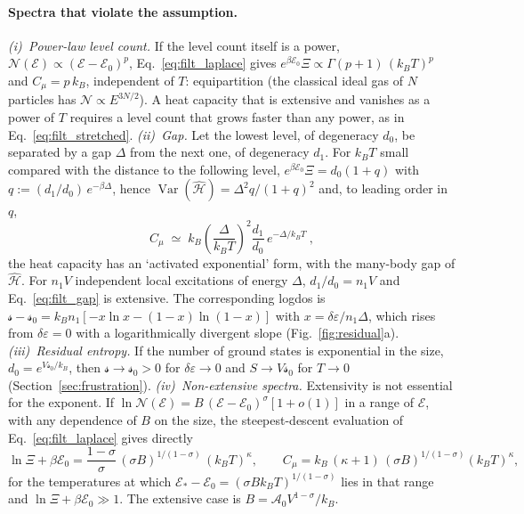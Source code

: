 \documentclass[10pt,a4paper]{article}
\theoremstyle{plain}
\newcommand{\Var}{\operatorname{Var}}
\newcommand{\cN}{\mathcal{N}}   %
\newcommand{\cA}{{\mathcal{A}_0}}   %
\newcommand{\lndos}{{logdos}}  %
\newcommand{\enrg}{\mathcal{E}}  %
\newcommand{\lds}{\mathscr{s}}  %
\begin{document}
\paragraph{Spectra that violate the assumption.}
\emph{(i)~Power-law level count.} If the level count itself is a power,
$\cN(\enrg)\propto(\enrg-\enrg_0)^{p}$, Eq.~\eqref{eq:filt_laplace} gives
$e^{\beta\enrg_0}\Xi\propto\Gamma(p+1)\,(k_BT)^{p}$ and $C_\mu=p\,k_B$,
independent of $T$: equipartition (the classical ideal gas of $N$ particles
has $\cN\propto E^{3N/2}$). A heat capacity that is extensive and vanishes
as a power of $T$ requires a level count that grows faster than any power,
as in Eq.~\eqref{eq:filt_stretched}.
\emph{(ii)~Gap.} Let the lowest level, of degeneracy $d_0$, be separated by
a gap $\Delta$ from the next one, of degeneracy $d_1$. For $k_BT$ small
compared with the distance to the following level,
$e^{\beta\enrg_0}\Xi=d_0(1+q)$ with $q:=(d_1/d_0)\,e^{-\beta\Delta}$, hence
$\Var(\hat{\mathcal H})=\Delta^{2}q/(1+q)^{2}$ and, to leading order in $q$,
\begin{equation}\label{eq:filt_gap}
  C_\mu \;\simeq\; k_B\left(\frac{\Delta}{k_BT}\right)^{2}\frac{d_1}{d_0}\,e^{-\Delta/k_BT} ~,
\end{equation}
the heat capacity has an `activated exponential' form, with the many-body gap of
$ \hat{\mathcal{H}} $. For $n_1V$ independent local excitations of energy
$\Delta$, $d_1/d_0=n_1V$ and Eq.~\eqref{eq:filt_gap} is extensive. The
corresponding \lndos{} is
$\lds-\lds_0=k_Bn_1[-x\ln x-(1-x)\ln(1-x)]$ with
$x=\delta\varepsilon/n_1\Delta$, which rises from $\delta\varepsilon=0$ with a
logarithmically divergent slope (Fig.~\ref{fig:residual}a).
\emph{(iii)~Residual entropy.} If the number of ground states is exponential
in the size, $d_0=e^{V\lds_0/k_B}$, then $\lds\to\lds_0>0$ for
$\delta\varepsilon\to0$ and $S\to V\lds_0$ for $T\to0$
(Section~\ref{sec:frustration}).
\emph{(iv)~Non-extensive spectra.} Extensivity is not essential for the
exponent. If $\ln\cN(\enrg)=B\,(\enrg-\enrg_0)^{\sigma}[1+o(1)]$ in a range of
$\enrg$, with any dependence of $B$ on the size, the steepest-descent
evaluation of Eq.~\eqref{eq:filt_laplace} gives directly
\begin{equation}\label{eq:filt_total}
  \ln\Xi+\beta\enrg_0=\frac{1-\sigma}{\sigma}\,(\sigma B)^{1/(1-\sigma)}\,(k_BT)^{\kappa} ,
  \qquad
  C_\mu=k_B\,(\kappa+1)\,(\sigma B)^{1/(1-\sigma)}(k_BT)^{\kappa} ,
\end{equation}
for the temperatures at which
$\enrg_*-\enrg_0=(\sigma Bk_BT)^{1/(1-\sigma)}$ lies in that range and
$\ln\Xi+\beta\enrg_0\gg1$. The extensive case is $B=\cA V^{1-\sigma}/k_B$.
\end{document}
